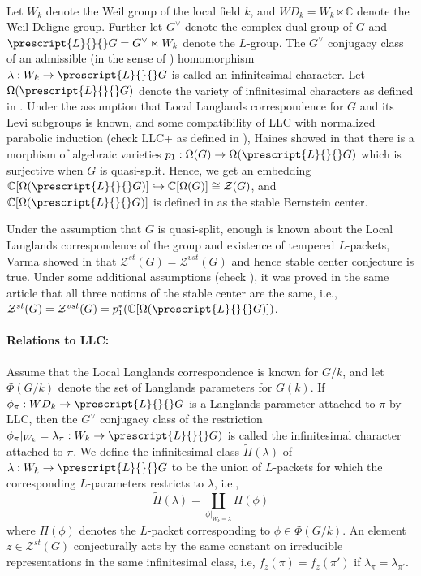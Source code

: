 \documentclass[11 pt]{article}
\numberwithin{equation}{subsection}
\theoremstyle{definition}
\theoremstyle{remark}
\theoremstyle{conjecture}
\newcommand{\C}{\mathbb C}
\newcommand{\ZZ}{\mathcal{Z}}
\begin{document}
\paragraph{}Let $W_k$ denote the Weil group of the local field $k$, and $WD_k=W_k\ltimes \C$ denote the Weil-Deligne group. Further let $G^\vee $ denote the complex dual group of $G$ and $\prescript{L}{}{}G= G^\vee \ltimes W_k$ denote the $L$-group. The $G^\vee$ conjugacy class of an admissible (in the sense of \cite[Section 5]{haines}) homomorphism $\lambda: W_k \rightarrow \prescript{L}{}{}G$ is called an infinitesimal character.  Let $\Omega(\prescript{L}{}{}G)$ denote the variety of infinitesimal characters as defined in \cite[Section 5.3]{haines}. Under the assumption that Local Langlands correspondence for $G$ and its Levi subgroups is known, and some compatibility of LLC with normalized parabolic induction (check LLC+ as defined in \cite[Definition 5.2.1]{haines}), Haines showed in \cite[Proposition 5.5.1]{haines} that there is a morphism of algebraic varieties $p_1: \Omega(G) \rightarrow \Omega(\prescript{L}{}{}G)$ which is surjective when $G $ is quasi-split. Hence, we get an embedding $\C[\Omega(\prescript{L}{}{}G)] \hookrightarrow\C[\Omega(G)]\cong \ZZ(G)$, and $\C[\Omega(\prescript{L}{}{}G)]$ is defined in \cite[Section 5.3]{haines} as the stable Bernstein center. \par

Under the assumption that $G$ is quasi-split, enough is known about the Local Langlands correspondence of the group and existence of tempered $L$-packets, Varma showed in \cite[Theorem 1.1.5]{varmastable} that $\ZZ^{st}(G)=\ZZ^{vst}(G)$ and hence stable center conjecture is true. Under some additional assumptions (check \cite[Proposition 1.1.7]{varmastable}), it was proved in the same article that all three notions of the stable center are the same, i.e., $\ZZ^{st}(G)=\ZZ^{vst}(G) = p_1^*(\C[\Omega(\prescript{L}{}{}G)])$. 

\paragraph{Relations to LLC:} Assume that the Local Langlands correspondence is known for $G/k$, and let $\Phi(G/k)$ denote the set of Langlands parameters for $G(k)$. If $\phi_\pi: WD_k\rightarrow \prescript{L}{}{}G$ is a Langlands parameter attached to $\pi$ by LLC, then the $G^\vee$ conjugacy class of the restriction $\phi_\pi|_{W_k}=\lambda_\pi:W_k \rightarrow \prescript{L}{}{}G) $ is called the infinitesimal character attached to $\pi$. We define the infinitesimal class $\tilde\Pi(\lambda)$ of $\lambda:W_k \rightarrow \prescript{L}{}{}G$ to be the union of $L$-packets for which the corresponding $L$-parameters restricts to $\lambda$, i.e.,
\begin{equation*}
    \tilde\Pi(\lambda)= \coprod_{\phi|_{W_k=\lambda}}\Pi(\phi)
\end{equation*}
where $ \Pi(\phi)$ denotes the $L$-packet corresponding to $\phi \in \Phi(G/k)$. An element $z \in \ZZ^{st}(G)$ conjecturally acts by the same constant on irreducible representations in the same infinitesimal class, i.e, $f_z(\pi)=f_z(\pi')$ if $\lambda_\pi=\lambda_{\pi'}$. 
\end{document}
